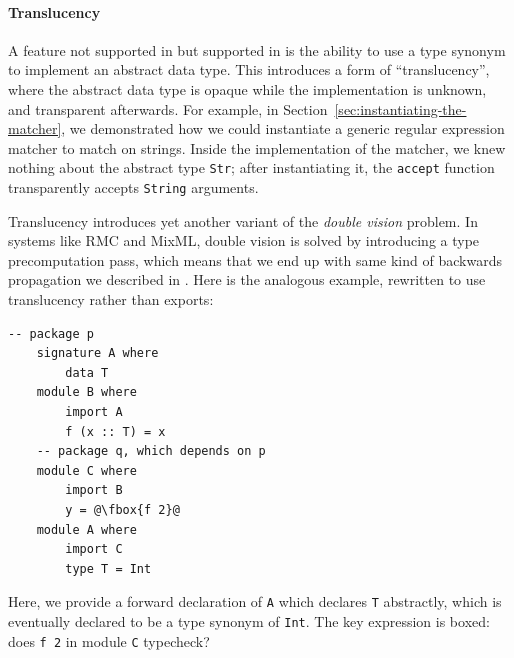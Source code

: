 


\paragraph{Translucency}  A feature not supported in \OldBackpack{}
but supported in \Backpack{} is
the ability to use a type synonym to implement an abstract data type.
This introduces a form of ``translucency'', where the abstract data type
is opaque while the implementation is unknown, and transparent afterwards.
For example, in Section~\ref{sec:instantiating-the-matcher}, we demonstrated
how we could instantiate a generic regular expression matcher to match on strings.
Inside the implementation of the matcher, we knew nothing about the abstract
type \verb|Str|; after instantiating it, the \verb|accept| function
transparently accepts \verb|String| arguments.

Translucency introduces yet another variant of the \emph{double vision}
problem.  In systems like RMC and MixML, double vision is solved by
introducing a type precomputation pass, which means that we end up
with same kind of backwards propagation we described in \OldBackpack{}.
Here is the analogous example, rewritten to use translucency rather than
exports:

\begin{lstlisting}[escapechar=@]
    -- package p
    signature A where
        data T
    module B where
        import A
        f (x :: T) = x
    -- package q, which depends on p
    module C where
        import B
        y = @\fbox{f 2}@
    module A where
        import C
        type T = Int
\end{lstlisting}
%
Here, we provide a forward declaration of \verb|A| which
declares \verb|T| abstractly, which is eventually declared to be
a type synonym of \verb|Int|.  The key expression is boxed: does \verb|f 2|
in module \verb|C| typecheck?

